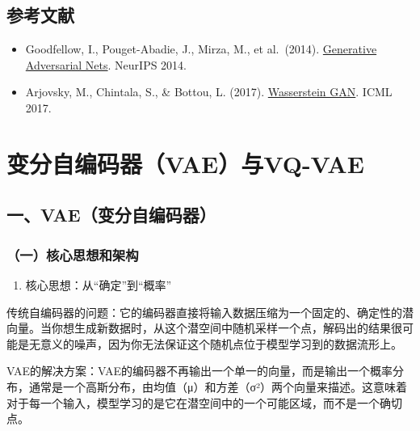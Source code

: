 \hypertarget{ux53c2ux8003ux6587ux732e-37}{%
\subsection{参考文献}\label{ux53c2ux8003ux6587ux732e-37}}

\begin{itemize}
\tightlist
\item
  Goodfellow, I., Pouget-Abadie, J., Mirza, M., et al.~(2014). \href{https://papers.nips.cc/paper/5423-generative-adversarial-nets}{Generative Adversarial Nets}. NeurIPS 2014.
\item
  Arjovsky, M., Chintala, S., \& Bottou, L. (2017). \href{https://arxiv.org/abs/1701.07875}{Wasserstein GAN}. ICML 2017.
\end{itemize}

\clearpage

\hypertarget{ux53d8ux5206ux81eaux7f16ux7801ux5668vaeux4e0evq-vae}{%
\section{变分自编码器（VAE）与VQ-VAE}\label{ux53d8ux5206ux81eaux7f16ux7801ux5668vaeux4e0evq-vae}}

\hypertarget{ux4e00vaeux53d8ux5206ux81eaux7f16ux7801ux5668}{%
\subsection{一、VAE（变分自编码器）}\label{ux4e00vaeux53d8ux5206ux81eaux7f16ux7801ux5668}}

\hypertarget{ux4e00ux6838ux5fc3ux601dux60f3ux548cux67b6ux6784}{%
\subsubsection{（一）核心思想和架构}\label{ux4e00ux6838ux5fc3ux601dux60f3ux548cux67b6ux6784}}

\begin{enumerate}
\def\labelenumi{\arabic{enumi}.}
\tightlist
\item
  核心思想：从``确定''到``概率''
\end{enumerate}

传统自编码器的问题：它的编码器直接将输入数据压缩为一个固定的、确定性的潜向量。当你想生成新数据时，从这个潜空间中随机采样一个点，解码出的结果很可能是无意义的噪声，因为你无法保证这个随机点位于模型学习到的数据流形上。

VAE的解决方案：VAE的编码器不再输出一个单一的向量，而是输出一个概率分布，通常是一个高斯分布，由均值（μ）和方差（σ²）两个向量来描述。这意味着对于每一个输入，模型学习的是它在潜空间中的一个可能区域，而不是一个确切点。

